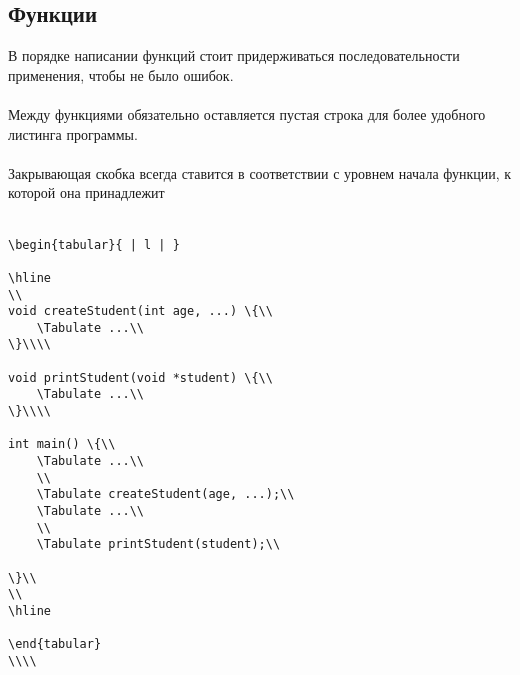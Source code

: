 \documentclass{article}
\begin{document}
\subsection{Функции}
В порядке написании функций стоит придерживаться последовательности применения, чтобы не было ошибок.\\\\
Между функциями обязательно оставляется пустая строка для более удобного листинга программы.\\\\
Закрывающая скобка всегда ставится в соответствии с уровнем начала функции, к которой она принадлежит\\\\
\begin{lstlisting}
\begin{tabular}{ | l | }

\hline
\\
void createStudent(int age, ...) \{\\
    \Tabulate ...\\
\}\\\\

void printStudent(void *student) \{\\
    \Tabulate ...\\
\}\\\\

int main() \{\\
	\Tabulate ...\\
	\\
	\Tabulate createStudent(age, ...);\\
	\Tabulate ...\\
	\\
	\Tabulate printStudent(student);\\

\}\\
\\
\hline

\end{tabular}
\\\\
\end{lstlisting}
\end{document}
